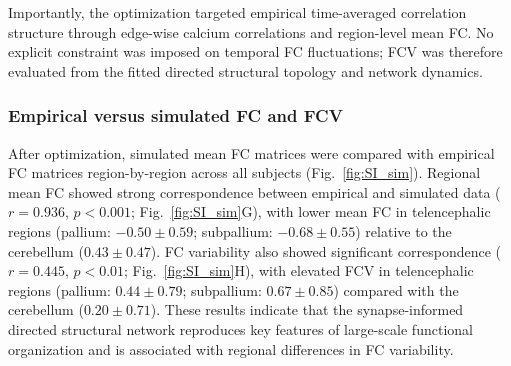 \documentclass[9pt,twoside]{pnas-new}
\begin{document}
Importantly, the optimization targeted empirical time-averaged correlation structure through
edge-wise calcium correlations and region-level mean FC\@. No explicit constraint was imposed
on temporal FC fluctuations; FCV was therefore evaluated from the fitted directed structural
topology and network dynamics.

\subsubsection*{Empirical versus simulated FC and FCV}

After optimization, simulated mean FC matrices were compared with empirical FC matrices region-by-region across all subjects (Fig.~\ref{fig:SI_sim}). Regional mean FC showed strong correspondence between empirical and simulated data ($r = 0.936$, $p < 0.001$; Fig.~\ref{fig:SI_sim}G), with lower mean FC in telencephalic regions (pallium: $-0.50 \pm 0.59$; subpallium: $-0.68 \pm 0.55$) relative to the cerebellum ($0.43 \pm 0.47$). FC variability also showed significant correspondence ($r = 0.445$, $p < 0.01$; Fig.~\ref{fig:SI_sim}H), with elevated FCV in telencephalic regions (pallium: $0.44 \pm 0.79$; subpallium: $0.67 \pm 0.85$) compared with the cerebellum ($0.20 \pm 0.71$). These results indicate that the synapse-informed directed structural network reproduces key features of large-scale functional organization and is associated with regional differences in FC variability.
\end{document}
